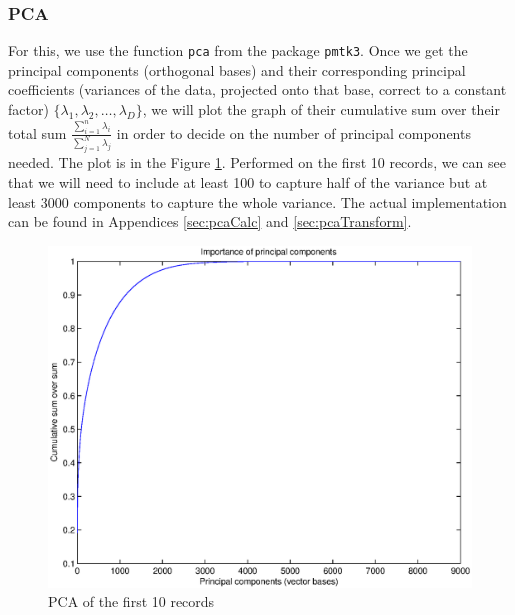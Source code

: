 \subsubsection{PCA}
	For this, we use the function \verb!pca! from the package \verb!pmtk3!. Once we get the principal components (orthogonal bases) and their corresponding principal coefficients (variances of the data, projected onto that base, correct to a constant factor) $\{\lambda_1, \lambda_2, \dotsc, \lambda_D\}$, we will plot the graph of their cumulative sum over their total sum $\frac{\sum_{i = 1}^n \lambda_i}{\sum_{j = 1}^N \lambda_j}$ in order to decide on the number of principal components needed. The plot is in the Figure \ref{fig:visualisePca}. Performed on the first 10 records, we can see that we will need to include at least 100 to capture half of the variance but at least 3000 components to capture the whole variance. The actual implementation can be found in Appendices \ref{sec:pcaCalc} and \ref{sec:pcaTransform}.
	\begin{figure}[ht!]
		\centering
			\includegraphics[width=.5\textwidth]{drawings/visualisePca.eps}
		\caption{PCA of the first 10 records}
		\label{fig:visualisePca}
	\end{figure}